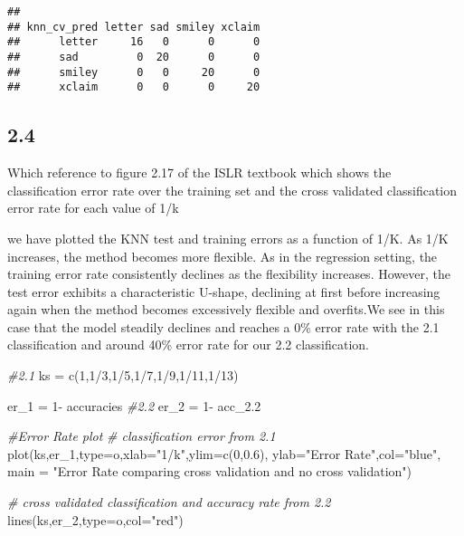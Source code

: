 \documentclass[
]{article}
\newenvironment{Shaded}{\begin{snugshade}}{\end{snugshade}}
\newcommand{\AttributeTok}[1]{\textcolor[rgb]{0.77,0.63,0.00}{#1}}
\newcommand{\CommentTok}[1]{\textcolor[rgb]{0.56,0.35,0.01}{\textit{#1}}}
\newcommand{\DecValTok}[1]{\textcolor[rgb]{0.00,0.00,0.81}{#1}}
\newcommand{\FloatTok}[1]{\textcolor[rgb]{0.00,0.00,0.81}{#1}}
\newcommand{\FunctionTok}[1]{\textcolor[rgb]{0.00,0.00,0.00}{#1}}
\newcommand{\NormalTok}[1]{#1}
\newcommand{\OtherTok}[1]{\textcolor[rgb]{0.56,0.35,0.01}{#1}}
\newcommand{\SpecialCharTok}[1]{\textcolor[rgb]{0.00,0.00,0.00}{#1}}
\newcommand{\StringTok}[1]{\textcolor[rgb]{0.31,0.60,0.02}{#1}}
\begin{document}
\begin{verbatim}
##            
## knn_cv_pred letter sad smiley xclaim
##      letter     16   0      0      0
##      sad         0  20      0      0
##      smiley      0   0     20      0
##      xclaim      0   0      0     20
\end{verbatim}

\hypertarget{section-5}{%
\subsection{2.4}\label{section-5}}

Which reference to figure 2.17 of the ISLR textbook which shows the
classification error rate over the training set and the cross validated
classification error rate for each value of 1/k

we have plotted the KNN test and training errors as a function of 1/K.
As 1/K increases, the method becomes more flexible. As in the regression
setting, the training error rate consistently declines as the
flexibility increases. However, the test error exhibits a characteristic
U-shape, declining at first before increasing again when the method
becomes excessively flexible and overfits.We see in this case that the
model steadily declines and reaches a 0\% error rate with the 2.1
classification and around 40\% error rate for our 2.2 classification.

\begin{Shaded}
\begin{Highlighting}[]
\CommentTok{\#2.1}
\NormalTok{ks }\OtherTok{=} \FunctionTok{c}\NormalTok{(}\DecValTok{1}\NormalTok{,}\DecValTok{1}\SpecialCharTok{/}\DecValTok{3}\NormalTok{,}\DecValTok{1}\SpecialCharTok{/}\DecValTok{5}\NormalTok{,}\DecValTok{1}\SpecialCharTok{/}\DecValTok{7}\NormalTok{,}\DecValTok{1}\SpecialCharTok{/}\DecValTok{9}\NormalTok{,}\DecValTok{1}\SpecialCharTok{/}\DecValTok{11}\NormalTok{,}\DecValTok{1}\SpecialCharTok{/}\DecValTok{13}\NormalTok{)}

\NormalTok{er\_1 }\OtherTok{=} \DecValTok{1}\SpecialCharTok{{-}}\NormalTok{ accuracies}
\CommentTok{\#2.2 }
\NormalTok{er\_2 }\OtherTok{=} \DecValTok{1}\SpecialCharTok{{-}}\NormalTok{ acc\_2}\FloatTok{.2}
 


  \CommentTok{\#Error Rate plot}
\CommentTok{\# classification error from 2.1}
\FunctionTok{plot}\NormalTok{(ks,er\_1,}\AttributeTok{type=}\StringTok{\textquotesingle{}o\textquotesingle{}}\NormalTok{,}\AttributeTok{xlab=}\StringTok{"1/k"}\NormalTok{,}\AttributeTok{ylim=}\FunctionTok{c}\NormalTok{(}\DecValTok{0}\NormalTok{,}\FloatTok{0.6}\NormalTok{),  }\AttributeTok{ylab=}\StringTok{"Error Rate"}\NormalTok{,}\AttributeTok{col=}\StringTok{"blue"}\NormalTok{, }\AttributeTok{main =} \StringTok{"Error Rate comparing cross validation and no cross validation"}\NormalTok{)}

\CommentTok{\# cross validated classification and accuracy rate from 2.2}
\FunctionTok{lines}\NormalTok{(ks,er\_2,}\AttributeTok{type=}\StringTok{\textquotesingle{}o\textquotesingle{}}\NormalTok{,}\AttributeTok{col=}\StringTok{"red"}\NormalTok{)}
\end{Highlighting}
\end{Shaded}
\end{document}
